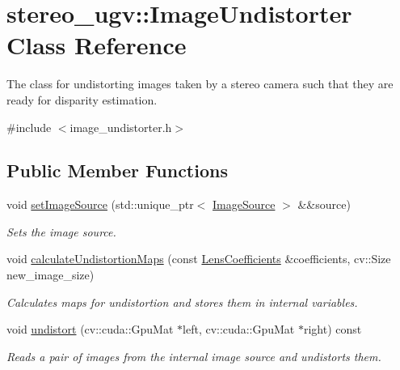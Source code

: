 \hypertarget{classstereo__ugv_1_1ImageUndistorter}{}\section{stereo\+\_\+ugv\+:\+:Image\+Undistorter Class Reference}
\label{classstereo__ugv_1_1ImageUndistorter}


The class for undistorting images taken by a stereo camera such that they are ready for disparity estimation.  




{\ttfamily \#include $<$image\+\_\+undistorter.\+h$>$}

\subsection*{Public Member Functions}
\begin{DoxyCompactItemize}
\item 
void \hyperlink{classstereo__ugv_1_1ImageUndistorter_aef84d98cbcfc32fcdd725a7c3bcebf72}{set\+Image\+Source} (std\+::unique\+\_\+ptr$<$ \hyperlink{classstereo__ugv_1_1ImageSource}{Image\+Source} $>$ \&\&source)
\begin{DoxyCompactList}\small\item\em Sets the image source. \end{DoxyCompactList}\item 
void \hyperlink{classstereo__ugv_1_1ImageUndistorter_a6351c3b0ff279c72e903fa1bde8400d7}{calculate\+Undistortion\+Maps} (const \hyperlink{structstereo__ugv_1_1LensCoefficients}{Lens\+Coefficients} \&coefficients, cv\+::\+Size new\+\_\+image\+\_\+size)
\begin{DoxyCompactList}\small\item\em Calculates maps for undistortion and stores them in internal variables. \end{DoxyCompactList}\item 
void \hyperlink{classstereo__ugv_1_1ImageUndistorter_ac5d966202bb27b1590f44527bbf05394}{undistort} (cv\+::cuda\+::\+Gpu\+Mat $\ast$left, cv\+::cuda\+::\+Gpu\+Mat $\ast$right) const
\begin{DoxyCompactList}\small\item\em Reads a pair of images from the internal image source and undistorts them. \end{DoxyCompactList}\end{DoxyCompactItemize}


